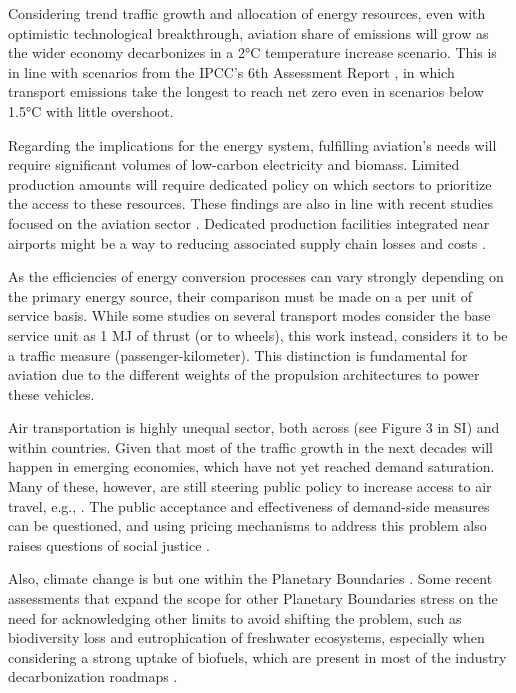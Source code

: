 \documentclass[a4paper,fleqn]{cas-dc}
\begin{document}
Considering trend traffic growth and allocation of energy resources, even with optimistic technological breakthrough, aviation share of emissions will grow as the wider economy decarbonizes in a 2°C temperature increase scenario. This is in line with scenarios from the IPCC's 6th Assessment Report \cite[][Figure 3.19]{long_ar6_wg3}, in which transport emissions take the longest to reach net zero even in scenarios below 1.5°C with little overshoot.

Regarding the implications for the energy system, fulfilling aviation's needs will require significant volumes of low-carbon electricity and biomass. Limited production amounts will require dedicated policy on which sectors to prioritize the access to these resources. These findings are also in line with recent studies focused on the aviation sector \cite{becken_implications_2023, eaton_regional_2024, drunert_ptl}. Dedicated production facilities integrated near airports might be a way to reducing associated supply chain losses and costs \cite{hoelzen_h2-powered_2025}.

As the efficiencies of energy conversion processes can vary strongly depending on the primary energy source, their comparison must be made on a per unit of service basis. While some studies on several transport modes \cite{wallington_green_2024} consider the base service unit as 1 MJ of thrust (or to wheels), this work instead, considers it to be a traffic measure (passenger-kilometer). This distinction is fundamental for aviation due to the different weights of the propulsion architectures to power these vehicles.

Air transportation is highly unequal sector, both across (see Figure 3 in SI) and within \cite{GOSSLING2020102194} countries. Given that most of the traffic growth in the next decades will happen in emerging economies, which have not yet reached demand saturation. Many of these, however, are still steering public policy to increase access to air travel, e.g., \cite{voa-brasil}. The public acceptance and effectiveness of demand-side measures can be questioned, and using pricing mechanisms to address this problem also raises questions of social justice \cite{Buchs02012024}.

Also, climate change is but one within the Planetary Boundaries \cite{rockstrom_safe_2009, richardson_earth_2023}. Some recent assessments that expand the scope for other Planetary Boundaries \cite{pais_current_2024} stress on the need for acknowledging other limits to avoid shifting the problem, such as biodiversity loss and eutrophication of freshwater ecosystems, especially when considering a strong uptake of biofuels, which are present in most of the industry decarbonization roadmaps \cite{becken_implications_2023}.
\end{document}
